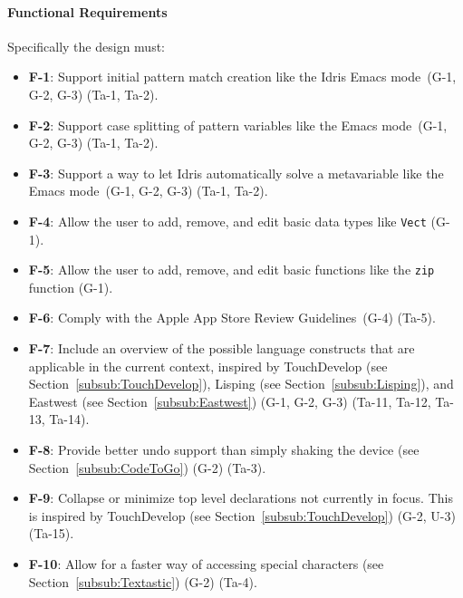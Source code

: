 \paragraph{Functional Requirements}

Specifically the design must:

\begin{itemize}
	\item \textbf{F-1}: Support initial pattern match creation like the Idris Emacs mode\,\cite{Idris:EmacsMode} (G-1, G-2, G-3)
	(Ta-1, Ta-2).
	\item \textbf{F-2}: Support case splitting of pattern variables like the Emacs mode\,\cite{Idris:EmacsMode} (G-1, G-2, G-3) (Ta-1, Ta-2).
	\item \textbf{F-3}: Support a way to let Idris automatically solve a metavariable like the Emacs mode\,\cite{Idris:EmacsMode} (G-1, G-2, G-3) (Ta-1, Ta-2).
	\item \textbf{F-4}: Allow the user to add, remove, and edit basic data types like \texttt{Vect} (G-1).
	\item \textbf{F-5}: Allow the user to add, remove, and edit basic functions like the \texttt{zip} function (G-1).
	\item \textbf{F-6}: Comply with the Apple App Store Review Guidelines\,\cite{AppStoreGuidelines} (G-4)
	(Ta-5).
	\item \textbf{F-7}: Include an overview of the possible language constructs that are applicable in the current context, inspired by TouchDevelop (see Section~\ref{subsub:TouchDevelop}), Lisping (see Section~\ref{subsub:Lisping}), and Eastwest (see Section~\ref{subsub:Eastwest}) (G-1, G-2, G-3)
	(Ta-11, Ta-12, Ta-13, Ta-14).
	\item \textbf{F-8}: Provide better undo support than simply shaking the device (see Section~\ref{subsub:CodeToGo}) (G-2)
	(Ta-3).
	\item \textbf{F-9}: Collapse or minimize top level declarations not currently in focus. This is inspired by TouchDevelop (see Section~\ref{subsub:TouchDevelop}) (G-2, U-3)
	(Ta-15).
	\item \textbf{F-10}: Allow for a faster way of accessing special characters (see Section~\ref{subsub:Textastic}) (G-2)
	(Ta-4).
\end{itemize}
